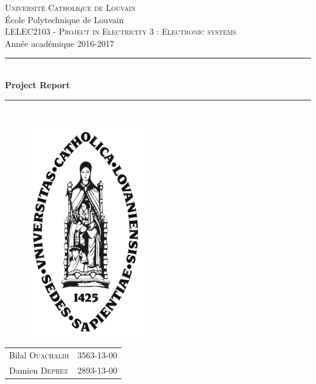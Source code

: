 \documentclass[a4paper, 12pt]{report}
\begin{document}
\begin{titlepage}
\newcommand{\HRule}{\rule{\linewidth}{0.5mm}} 
\center 

\textsc{\Large Universit\'e Catholique de Louvain}\\[0,25cm]
{\large \'Ecole Polytechnique de Louvain}\\[0,5cm]
\textsc{\LARGE LELEC2103 - Project in Electricity 3 : Electronic systems}\\[0.25cm]
{\large Ann\'ee acad\'emique 2016-2017}\\[0,5cm] 

\HRule \\[0.4cm]
{ \huge \bfseries Project Report }\\ [0.5cm] %
\HRule \\[0.1cm] %

\begin{figure}[ht]
\centering
\includegraphics [height=9cm] {img/ucl}
\end{figure}

\begin{minipage}{0.7\textwidth}
\begin{center}
\begin{tabular}{lc}
Bilal \textsc{Ouachalih} & 3563-13-00\\
Damien \textsc{Deprez} & 2893-13-00 \\
\end{tabular}
\end{center}
\end{minipage}\\[0.6cm]


\end{titlepage}
\end{document}
